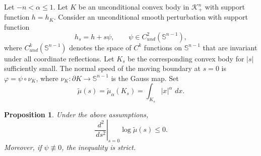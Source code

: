 \documentclass[12pt,leqno]{amsart}
\theoremstyle{plain} \newtheorem{thm}{Theorem}[section]
\theoremstyle{plain} \newtheorem{prop}[thm]{Proposition}
\theoremstyle{plain} \newtheorem{prob}[thm]{Problem}
\theoremstyle{definition} \newtheorem{defi}[thm]{Definition}
\theoremstyle{plain} \newtheorem{cor}[thm]{Corollary}
\theoremstyle{plain} \newtheorem{lem}[thm]{Lemma}
\theoremstyle{plain} \newtheorem{eg}{Example}[section]
\theoremstyle{remark} \newtheorem{rmk}[thm]{Remark}
\theoremstyle{plain} \newtheorem{conj}{Conjecture}
\numberwithin{equation}{section}
\newcommand{\dd}{\,d}
\begin{document}
Let $-n<\alpha\le 1$. Let $K$ be an unconditional convex body in $\mathcal{K}_{+}^n$ with support function $h=h_K$. Consider an unconditional smooth perturbation with support function
\[
  h_s=h+s\psi,
  \qquad \psi\in C_{und}^2(\mathbb S^{n-1}),
\]
where $C^k_{und}(\mathbb{S}^{n-1})$ denotes the space of $C^k$ functions on $\mathbb{S}^{n-1}$ that are invariant under all coordinate reflections. Let $K_s$ be the corresponding convex body for $|s|$ sufficiently
small. The normal speed of the moving boundary at $s=0$ is $ \varphi=\psi\circ\nu_K$, where $\nu_K:\partial K\to\mathbb S^{n-1}$ is the Gauss map. Set
\[
  \tilde{\mu}(s)=\tilde{\mu}_\alpha(K_s)
  =\int_{K_s}|x|^\alpha\,\dd x .
\]

\begin{prop}\label{prop-local-logconcave-strict} 
  Under the above assumptions,
  \[
    \left.\frac{\dd^2}{\dd s^2}\right|_{s=0}
    \log \tilde{\mu}(s)\le 0 .
  \]
  Moreover, if $\psi\not\equiv 0$, the inequality is strict.
\end{prop}
\end{document}
